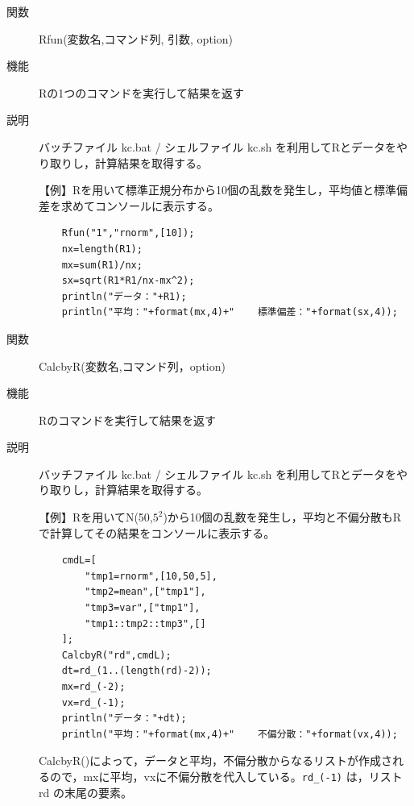 \documentclass[papersize,a4paper,12pt,uplatex]{jsarticle}
\begin{document}
\begin{description}
\hypertarget{rfun}{}
\item[関数]  Rfun(変数名,コマンド列, 引数, option)
\item[機能]  Rの1つのコマンドを実行して結果を返す
\item[説明]  バッチファイル kc.bat / シェルファイル kc.sh を利用してRとデータをやり取りし，計算結果を取得する。

\vspace{\baselineskip}
【例】Rを用いて標準正規分布から10個の乱数を発生し，平均値と標準偏差を求めてコンソールに表示する。
\begin{verbatim}
    Rfun("1","rnorm",[10]);
    nx=length(R1);
    mx=sum(R1)/nx;
    sx=sqrt(R1*R1/nx-mx^2);
    println("データ："+R1);
    println("平均："+format(mx,4)+"    標準偏差："+format(sx,4));
\end{verbatim}

\hypertarget{calcbyr}{}
\item[関数]  CalcbyR(変数名,コマンド列，option)
\item[機能]  Rのコマンドを実行して結果を返す
\item[説明]  バッチファイル kc.bat / シェルファイル kc.sh を利用してRとデータをやり取りし，計算結果を取得する。

\vspace{\baselineskip}
【例】Rを用いてN(50,$5^2$)から10個の乱数を発生し，平均と不偏分散もRで計算してその結果をコンソールに表示する。
\begin{verbatim}
    cmdL=[
        "tmp1=rnorm",[10,50,5],
        "tmp2=mean",["tmp1"],
        "tmp3=var",["tmp1"],
        "tmp1::tmp2::tmp3",[]
    ];
    CalcbyR("rd",cmdL);
    dt=rd_(1..(length(rd)-2));
    mx=rd_(-2);
    vx=rd_(-1);
    println("データ："+dt);
    println("平均："+format(mx,4)+"    不偏分散："+format(vx,4));
\end{verbatim}
  CalcbyR()によって，データと平均，不偏分散からなるリストが作成されるので，mxに平均，vxに不偏分散を代入している。\verb|rd_(-1)| は，リスト rd の末尾の要素。
  

\end{description}
\end{document}

